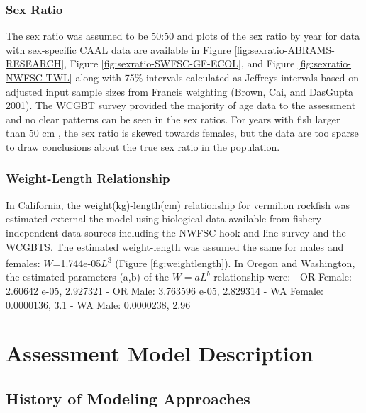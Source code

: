 \documentclass[
  english,
  a4paper,
]{article}
\begin{document}
\hypertarget{sex-ratio}{%
\subsubsection{Sex Ratio}\label{sex-ratio}}

The sex ratio was assumed to be 50:50 and plots of the sex ratio by year for data with sex-specific CAAL data are available in Figure \ref{fig:sexratio-ABRAMS-RESEARCH}, Figure \ref{fig:sexratio-SWFSC-GF-ECOL}, and
Figure \ref{fig:sexratio-NWFSC-TWL} along with 75\% intervals calculated as Jeffreys intervals based on adjusted input sample sizes from Francis weighting (Brown, Cai, and DasGupta 2001). The WCGBT survey provided the majority of age data to the assessment and no clear patterns can be seen in the sex ratios. For years with fish larger than 50 cm , the sex ratio is skewed towards females, but the data are too sparse to draw conclusions about the true sex ratio in the population.

\hypertarget{weight-length-relationship}{%
\subsubsection{Weight-Length Relationship}\label{weight-length-relationship}}

In California, the weight(kg)-length(cm) relationship for vermilion rockfish was estimated external the
model using biological data available from fishery-independent
data sources including the NWFSC hook-and-line survey and the WCGBTS. The estimated
weight-length was assumed the same for males and females:
\(W\)=1.744e-05\(L\)\textsuperscript{3}
(Figure \ref{fig:weightlength}).
In Oregon and Washington, the estimated parameters (a,b) of the \(W=aL^b\) relationship were:
- OR Female: 2.60642 e-05, 2.927321
- OR Male: 3.763596 e-05, 2.829314
- WA Female: 0.0000136, 3.1
- WA Male: 0.0000238, 2.96

\hypertarget{assessment-model-description}{%
\section{Assessment Model Description}\label{assessment-model-description}}

\hypertarget{history-of-modeling-approaches}{%
\subsection{History of Modeling Approaches}\label{history-of-modeling-approaches}}
\end{document}
